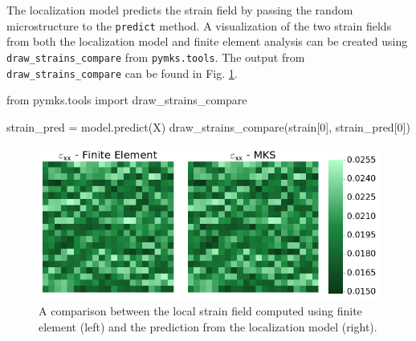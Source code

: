 \documentclass{bmcart}
\newcommand{\fimage}
{\fcolorbox{outcolor}{white}}
{}
\begin{document}
    The localization model predicts the strain field by passing the
random microstructure to the \texttt{predict} method. A visualization
of the two strain fields from both the localization model and finite element
analysis can be created using \texttt{draw\_strains\_compare} from
\texttt{pymks.tools}. The output from \texttt{draw\_strains\_compare}
can be found in Fig. \ref{fig:drawStrainCompare}.

\begin{_input}
from pymks.tools import draw_strains_compare

strain_pred = model.predict(X)
draw_strains_compare(strain[0], strain_pred[0])

\end{_input}

\begin{figure}
    \centering
    \includegraphics[scale=.535]{pymks_paper_localization_files/pymks_paper_localization_14_0.png}
    \caption{A comparison between the local strain field computed using finite element (left) and
    the prediction from the localization model (right).}
    \label{fig:drawStrainCompare}
\end{figure}



\end{document}
